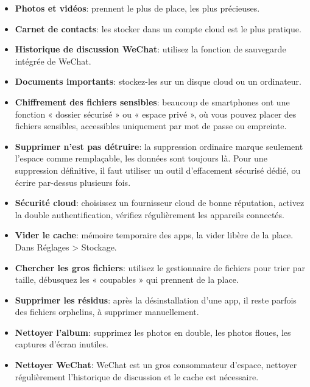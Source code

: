 
\begin{itemize}
  \item \textbf{Photos et vidéos}: prennent le plus de place, les plus précieuses.
  \item \textbf{Carnet de contacts}: les stocker dans un compte cloud est le plus pratique.
  \item \textbf{Historique de discussion WeChat}: utilisez la fonction de sauvegarde intégrée de WeChat.
  \item \textbf{Documents importants}: stockez-les sur un disque cloud ou un ordinateur.
\end{itemize}


\begin{itemize}
  \item \textbf{Chiffrement des fichiers sensibles}: beaucoup de smartphones ont une fonction « dossier sécurisé » ou « espace privé », où vous pouvez placer des fichiers sensibles, accessibles uniquement par mot de passe ou empreinte.
  \item \textbf{Supprimer n'est pas détruire}: la suppression ordinaire marque seulement l'espace comme remplaçable, les données sont toujours là. Pour une suppression définitive, il faut utiliser un outil d'effacement sécurisé dédié, ou écrire par-dessus plusieurs fois.
  \item \textbf{Sécurité cloud}: choisissez un fournisseur cloud de bonne réputation, activez la double authentification, vérifiez régulièrement les appareils connectés.
\end{itemize}


\begin{itemize}
  \item \textbf{Vider le cache}: mémoire temporaire des apps, la vider libère de la place. Dans Réglages > Stockage.
  \item \textbf{Chercher les gros fichiers}: utilisez le gestionnaire de fichiers pour trier par taille, débusquez les « coupables » qui prennent de la place.
  \item \textbf{Supprimer les résidus}: après la désinstallation d'une app, il reste parfois des fichiers orphelins, à supprimer manuellement.
  \item \textbf{Nettoyer l'album}: supprimez les photos en double, les photos floues, les captures d'écran inutiles.
  \item \textbf{Nettoyer WeChat}: WeChat est un gros consommateur d'espace, nettoyer régulièrement l'historique de discussion et le cache est nécessaire.
\end{itemize}

